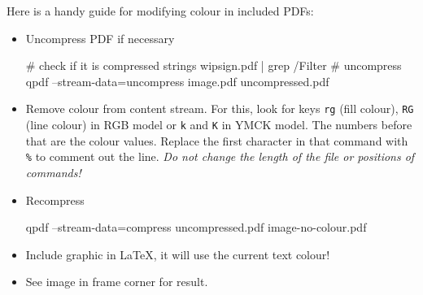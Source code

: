 \documentclass[mathserif, fleqn]{beamer}
\begin{document}
\begin{frame}
  \scriptsize
  Here is a handy guide for modifying colour in included PDFs:
  \begin{itemize}
  \item Uncompress PDF if necessary
    \begin{shell}[]
# check if it is compressed
strings wipsign.pdf | grep /Filter
# uncompress
qpdf --stream-data=uncompress image.pdf uncompressed.pdf
    \end{shell}
  \item Remove colour from content stream. For this, look for keys \verb$rg$ (fill colour), \verb$RG$ (line colour) in RGB model or \verb$k$ and \verb$K$ in YMCK model. The numbers before that are the colour values.
    Replace the first character in that command with \verb$%$ to comment out the line. \emph{Do not change the length of the file or positions of commands!}
  \item Recompress
    \begin{shell}[]
qpdf --stream-data=compress uncompressed.pdf image-no-colour.pdf
    \end{shell}
  \item Include graphic in \LaTeX, it will use the current text colour!
  \item See image in frame corner for result.
  \end{itemize}
\end{frame}
\end{document}
